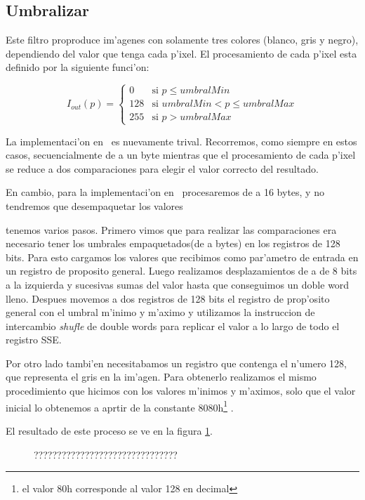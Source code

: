 \subsection{Umbralizar}
Este filtro proproduce im'agenes con solamente tres colores (blanco, gris y negro), dependiendo del valor que tenga cada p'ixel.
El procesamiento de cada p'ixel esta definido por la siguiente funci'on:

$$I_{out}(p) = \left\{\begin{array}{lcc} 0 & \text{si } p \leq umbralMin\\  128 & \text{si } umbralMin < p \leq umbralMax \\ 255 & \text{si } p > umbralMax \end{array} \right. $$

La implementaci'on en \C\ es nuevamente trival. Recorremos, como siempre en estos casos, secuencialmente de a un byte mientras que el procesamiento de cada p'ixel se reduce a dos comparaciones para elegir el valor correcto del resultado.

En cambio, para la implementaci'on en \ass\ procesaremos de a 16 bytes, y no tendremos que desempaquetar los valores

tenemos varios pasos. Primero vimos que para realizar las comparaciones era necesario tener los umbrales empaquetados(de a bytes) en los registros de 128 bits. Para esto cargamos los valores que recibimos como par'ametro de entrada en un registro de proposito general. Luego realizamos desplazamientos de a de 8 bits a la izquierda y sucesivas sumas del valor hasta que conseguimos un doble word lleno. Despues movemos a dos registros de 128 bits el registro de prop'osito general con el umbral m'inimo y m'aximo y utilizamos la instruccion de intercambio \textit{shufle} de double words para replicar el valor a lo largo de todo el registro SSE. 

Por otro lado tambi'en necesitabamos un registro que contenga el n'umero 128, que representa el gris en la im'agen.
Para obtenerlo realizamos el mismo procedimiento que hicimos con los valores m'inimos y m'aximos, solo que el valor inicial lo obtenemos a aprtir de la constante 8080h\footnote{el valor 80h corresponde al valor 128 en decimal} .

El resultado de este proceso se ve en la figura \ref{est:u-uno}.

\begin{figure}[h!]
\caption{???????????????????????????????}
\label{est:u-uno}
\end{figure}


